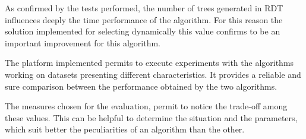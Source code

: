 \documentclass{acm_proc_article-sp-sigmod07}
\begin{document}
As confirmed by the tests performed, the number of trees generated in RDT
influences deeply the time performance of the algorithm. For this reason
the solution implemented for selecting dynamically this value confirms to
be an important improvement for this algorithm.

The platform implemented permits to execute experiments with the 
algorithms working on datasets presenting different characteristics. It
provides a reliable and sure comparison between the performance obtained
by the two algorithms.

The measures chosen for the evaluation, permit to notice the trade-off
among these values. This can be helpful to determine the situation and the
parameters, which suit better the peculiarities of an algorithm than the
other.


\end{document}
